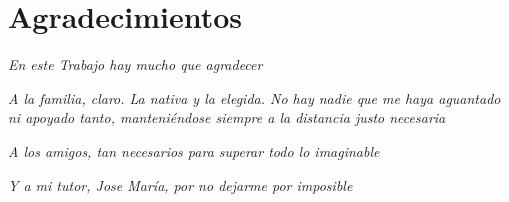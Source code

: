 \chapter*{Agradecimientos}
\thispagestyle{empty}
\label{cap:agradecimientos}

\begin{flushright}

	\textit{En este Trabajo hay mucho que agradecer}
	
		\vspace{2cm}
	\textit{A la familia, claro. La nativa y la elegida. No hay nadie que me haya aguantado ni apoyado tanto, manteniéndose siempre a la distancia justo necesaria}
	
		\vspace{1cm}
	\textit{A los amigos, tan necesarios para superar todo lo imaginable}
	
	\vspace{1cm}
	\textit{Y a mi tutor, Jose María, por no dejarme por imposible}
\end{flushright}

\afterpage{\null\newpage}
\pagestyle{empty}